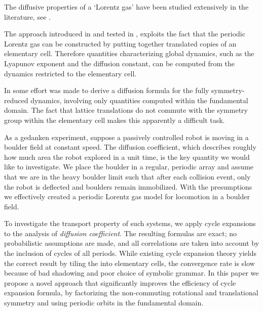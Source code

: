 
The diffusive properties of a `Lorentz gas'
have been studied extensively in the literature,
see .

The approach introduced in  and tested in
, exploits the fact that the periodic Lorentz gas can be
constructed by putting together translated copies of an elementary cell.
Therefore quantities characterizing global dynamics, such as the Lyapunov
exponent and the diffusion constant, can be computed from the dynamics
restricted to the elementary cell.

In  some effort was made to derive a diffusion
formula for the fully symmetry-reduced dynamics, involving only
quantities computed within the fundamental domain. The fact that lattice
translations do not commute with the symmetry group within the elementary
cell makes this apparently a difficult task.

As a gedanken experiment, suppose a passively controlled robot is moving
in a boulder field at constant speed. The diffusion coefficient, which
describes roughly how much area the robot explored in a unit time, is the
key quantity we would like to investigate. We place the boulder in a
regular, periodic array and assume that we are in the heavy boulder limit
such that after each collision event, only the robot is deflected and
boulders remain immobilized. With the presumptions we effectively created
a periodic Lorentz gas model for locomotion in a boulder
field.

To investigate the transport property of such systems, we apply cycle
expansions to the analysis of {\em diffusion coefficient}.
The resulting formulas are exact; no probabilistic assumptions are made,
and all correlations are taken into account by the  inclusion of cycles
of all periods. While existing cycle expansion theory yields the correct
result by tiling the {\statesp} into elementary cells, the convergence
rate is slow because of bad shadowing and poor choice of symbolic
grammar. In this paper we propose a novel approach that
significantly improves the efficiency of cycle expansion formula, by
factorizing the non-commuting rotational and translational symmetry and
using periodic orbits in the fundamental domain.


